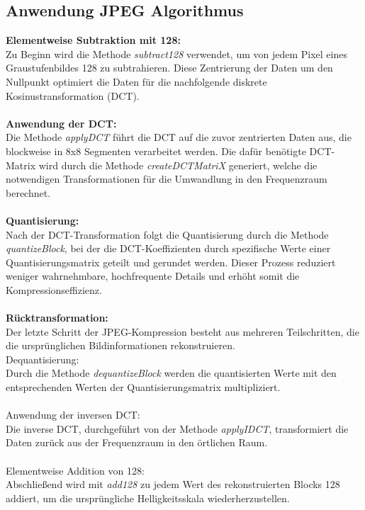 \documentclass[12pt]{article}
\begin{document}
		\subsection{Anwendung JPEG Algorithmus}
\textbf{Elementweise Subtraktion mit 128:} \\
Zu Beginn wird die Methode \textit{subtract128} verwendet, um von jedem Pixel eines Graustufenbildes 128 zu subtrahieren. Diese Zentrierung der Daten um den Nullpunkt optimiert die Daten für die nachfolgende diskrete Kosinustransformation (DCT). \\
\\
\textbf{Anwendung der DCT:} \\
Die Methode \textit{applyDCT} führt die DCT auf die zuvor zentrierten Daten aus, die blockweise in 8x8 Segmenten verarbeitet werden. Die dafür benötigte DCT-Matrix wird durch die Methode \textit{createDCTMatriX} generiert, welche die notwendigen Transformationen für die Umwandlung in den Frequenzraum berechnet. \\
\\
\textbf{Quantisierung:} \\
Nach der DCT-Transformation folgt die Quantisierung durch die Methode \textit{quantizeBlock}, bei der die DCT-Koeffizienten durch spezifische Werte einer Quantisierungsmatrix geteilt und gerundet werden. Dieser Prozess reduziert weniger wahrnehmbare, hochfrequente Details und erhöht somit die Kompressionseffizienz.\\
\\
\textbf{Rücktransformation:} \\
Der letzte Schritt der JPEG-Kompression besteht aus mehreren Teilschritten, die die ursprünglichen Bildinformationen rekonstruieren.
\\
Dequantisierung: \\
Durch die Methode \textit{dequantizeBlock} werden die quantisierten Werte mit den entsprechenden Werten der Quantisierungsmatrix multipliziert.\\
\\
Anwendung der inversen DCT: \\
Die inverse DCT, durchgeführt von der Methode \textit{applyIDCT}, transformiert die Daten zurück aus der Frequenzraum in den örtlichen Raum. \\
\\
Elementweise Addition von 128: \\
Abschließend wird mit \textit{add128} zu jedem Wert des rekonstruierten Blocks 128 addiert, um die ursprüngliche Helligkeitsskala wiederherzustellen. \\
\end{document}
